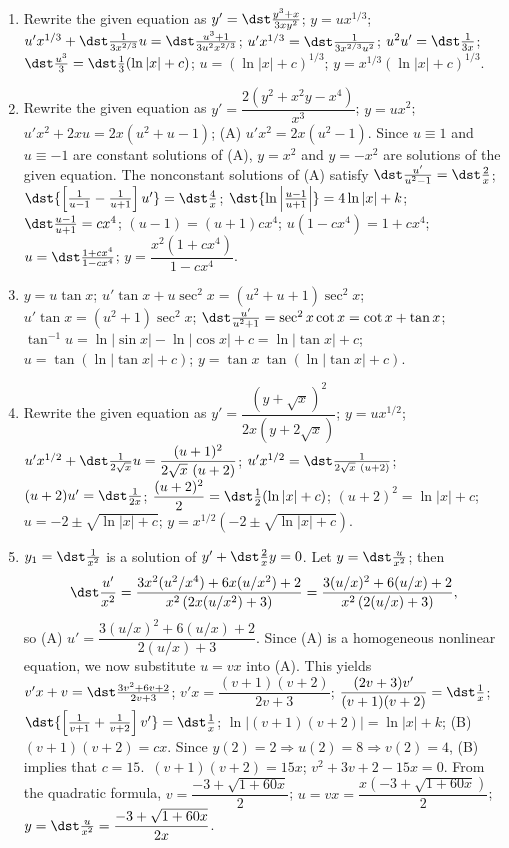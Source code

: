 \documentclass[openany]{book}
\newenvironment{sectionSolutions}{
 \begin{enumerate}[item-label={\thesection.\arabic{enumi}.}]
}{
 \end{enumerate}
}
\begin{document}
\begin{sectionSolutions}
\item
Rewrite the given equation as $y'=\dst\frac{y^3+x}{3xy^2}$;\;
$y=ux^{1/3}$;\;
$u'x^{1/3}+\dst\frac{1}{3x^{2/3}}u=\dst\frac{u^3+1}{3u^2x^{2/3}}$;\;
$u'x^{1/3}=\dst\frac{1}{3x^{2/3}u^2}$;\;
$u^2u'=\dst\frac{1}{3x}$;\;
$\dst\frac{u^3}{3}=\dst\frac{1}{3}(\ln|x|+c)$;\;
$u=(\ln|x|+c)^{1/3}$;\;
$y=x^{1/3}(\ln|x|+c)^{1/3}$.


\item
Rewrite the given equation as $y'=\dfrac{2(y^2+x^2y-x^4)}{
x^3}$;\;
$y=ux^2$;\;
$u'x^2+2xu=2x(u^2+u-1)$;\;
(A) $u'x^2=2x(u^2-1)$.
Since $u\equiv1$ and $u\equiv-1$ are constant solutions of (A),
$y=x^2$ and $y=-x^2$ are solutions of the given equation. The
nonconstant solutions of (A) satisfy
$\dst\frac{u'}{ u^2-1}=\dst\frac{2}{ x}$;\;
$\dst{\left[\frac{1}{ u-1}-\frac{1}{ u+1}\right]u'}=\dst\frac{4}{ x}$;\;
$\dst{\ln\left|\frac{u-1}{ u+1}\right|}=4\ln|x|+k$;\;
$\dst\frac{u-1}{ u+1}=cx^4$;\;
$(u-1)=(u+1)cx^4$;\;
$u(1-cx^4)=1+cx^4$;\;
$u=\dst\frac{1+cx^4}{1-cx^4}$;\;
$y=\dfrac{x^2(1+cx^4)}{1-cx^4}$.


\item
$y=u\tan x$;\;
$u'\tan x+u\sec^2x=(u^2+u+1)\sec^2x$;\;
$u'\tan x=(u^2+1)\sec^2x$;\;
$\dst\frac{u'}{ u^2+1}=\sec^2x\cot x=\cot x+\tan x$;\;
$\tan^{-1}u=\ln|\sin x|-\ln|\cos x|+c=\ln|\tan x|+c$;\;
$u=\tan(\ln|\tan x|+c)$;\;
$y=\tan x\ \tan(\ln|\tan x|+c)$.


\item
Rewrite the given equation as $y'=\dfrac{(y+\sqrt
x)^2}{2x(y+2\sqrt x)}$;\;
$y=ux^{1/2}$;\;
$u'x^{1/2}+\dst\frac{1}{2\sqrt x}u=\dfrac{(u+1)^2}{2\sqrt x\
(u+2)}$;\;
$u'x^{1/2}=\dst\frac{1}{2\sqrt x\ (u+2)}$;\;
$(u+2)u'=\dst\frac{1}{2x}$;\;
$\dfrac{(u+2)^2}{2}=\dst\frac{1}{2}(\ln|x|+c)$;\;
$(u+2)^2=\ln|x|+c$;\;
$u=-2\pm\sqrt{\ln|x|+c}$;\;
$y=x^{1/2}(-2\pm\sqrt{\ln|x|+c})$.


\item
$y_1=\dst\frac{1}{ x^2}$ is a solution of $y'+\dst\frac{2}{ x}y=0$.
Let $y=\dst\frac{u}{ x^2}$; then
\[
\dst\frac{u'}{ x^2}=\dfrac{3x^2(u^2/x^4)+6x(u/x^2)+2}{
x^2\left(2x(u/x^2)+3\right)}=
\dfrac{3(u/x)^2+6(u/x)+2}{ x^2\left(2(u/x)+3\right)},
\]
so (A) $u'=\dfrac{3(u/x)^2+6(u/x)+2}{2(u/x)+3}$. Since (A)
is a homogeneous nonlinear equation, we now substitute $u=vx$
into (A). This yields
$v'x+v=\dst\frac{3v^2+6v+2}{2v+3}$;\;
$v'x=\dfrac{(v+1)(v+2)}{2v+3}$;\;
$\dfrac{(2v+3)v'}{(v+1)(v+2)}=\dst\frac{1}{ x}$;\;
$\dst{\left[\frac{1}{ v+1}+\frac{1}{ v+2}\right]v'}=\dst\frac{1}{ x}$;\;
$\ln|(v+1)(v+2)|=\ln|x|+k$;\;
(B) $(v+1)(v+2)=cx$.
Since $y(2)=2\Rightarrow u(2)=8\Rightarrow v(2)=4$, (B) implies that
$c=15$.\ $(v+1)(v+2)=15x$;\;
$v^2+3v+2-15x=0$. From the quadratic formula,
$v=\dfrac{-3+\sqrt{1+60x}}{2}$;\;
$u=vx=\dfrac{x(-3+\sqrt{1+60x})}{2}$;\;
$y=\dst\frac{u}{ x^2}=\dfrac{-3+\sqrt{1+60x}}{2x}$.



\end{sectionSolutions}
\end{document}
